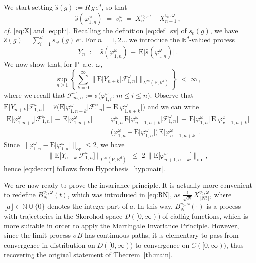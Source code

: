 \documentclass[a4paper,reqno,11pt]{amsart}
\numberwithin{equation}{section}
\newcommand{\bbP}{{\ensuremath{\mathbb P}} }
\newcommand{\cF}{{\ensuremath{\mathcal F}} }
\newcommand{\gs}{\sigma}
\newcommand{\go}{\omega}
\newcommand{\R}{\mathbb{R}}
\newcommand{\N}{\mathbb{N}}
\def\bP{\ensuremath{\bs{\mathrm{P}}}}
\def\bE{\ensuremath{\bs{\mathrm{E}}}}
\def\bs{\boldsymbol}
\renewcommand{\phi}{\varphi}
\begin{document}
We start setting $\hat s(g) := R \, g \, e^d$, so that
\begin{equation} \label{eq:increments}
	\hat s (\phi_{1,n}^\go) \;=\; v_n^\go \;=\; X_n^{v_0, \go} - X_{n-1}^{v_0, \go} \,,
\end{equation}
{\sl cf.} \eqref{eq:X} and \eqref{eq:phi}.
Recalling the definition \eqref{eq:def_sv} of $s_v(g)$, we have
$\hat s(g) = \sum_{i=1}^d s_{e^i}(g) \, e^i$.
For $n=1,2\dots$ we introduce the $\R^d$-valued process
\begin{equation} \label{eq:Y}
	Y_{n} \;:=\; \hat s (\varphi_{1,n}^\omega) \,-\, \bE\big[ \hat s(\varphi_{1,n}^\omega) \big] \,.
\end{equation}
We now show that, for $\bbP$--a.e.~$\go$,
\begin{equation} \label{eq:decorr}
	\sup_{n \ge 1} \left\{ \sum_{k=0}^\infty
	\big\| \bE \big[ Y_{n+k} \big| \cF_{1,n}^\go \big]
	\big\|_{L^\infty(\bP; \R^d)}
	\right\} \; < \; \infty \,,
\end{equation}
where we recall that
$\cF^\go_{m,n} := \gs\big( \phi_{1,i}^\go:\, m \le i \le n \big)$.
Observe that $\bE \big[ Y_{n+k} \big| \cF_{1,n}^\go \big] =
\hat s \big( \bE \big[ \varphi_{1,n+k}^\omega \big|  \cF_{1,n}^\go \big]
- \bE \big[ \varphi_{1,n+k}^\omega \big] \big)$ and we can write
\begin{equation}
\begin{split}
	\bE\big[ \varphi_{1,n+k}^\omega \big|  \cF_{1,n}^\go \big]
	\,-\, \bE \big[ \varphi_{1,n+k}^\omega \big] & \;=\;
	\varphi_{1,n}^\omega\, \bE\big[ \varphi_{n+1,n+k}^\omega \big|  \cF_{1,n}^\go \big]
	\,-\, \bE \big[ \varphi_{1,n}^\omega \big]
	\, \bE \big[ \varphi_{n+1,n+k}^\omega \big] \\
	& \;=\; \big( \varphi_{1,n}^\omega - \bE \big[ \varphi_{1,n}^\omega\big] \big)
	\, \bE\big[ \varphi_{n+1,n+k}^\omega \big] \,.
\end{split}
\end{equation}
Since $\big\| \varphi_{1,n}^\omega - \bE \big[ \varphi_{1,n}^\omega\big] \big\|_{\text{op}} \le 2$,
we have
\begin{equation}
	\big\| \bE \big[ Y_{n+k} \big| \cF_{1,n}^\go \big]
	\big\|_{L^\infty(\bP; \R^d)}
	\;\le\; 2 \, \big\| \bE\big[ \varphi_{n+1,n+k}^\omega \big] \big\|_{\text{op}}\,,
\end{equation}
hence \eqref{eq:decorr} follows from Hypothesis~\ref{hyp:main}.

We are now ready to prove the invariance principle.
It is actually more convenient to
redefine $B^{v_0, \go}_{N}(t)$, which was introduced
in \eqref{eq:BN}, as $\frac{1}{\sqrt N} \, X^{v_0, \omega}_{ \lfloor Nt\rfloor }$, where
$\lfloor a \rfloor \in \N \cup \{0\}$ denotes the integer part of $a$.
In this way, $B^{v_0, \go}_{N}(\cdot)$ is a process with trajectories in the Skorohod space
$D([0, \infty))$ of c\`adl\`ag functions, which is more suitable in order to apply
the Martingale Invariance Principle. However, since the limit process $\gs B$
has continuous paths,
it is elementary to pass from convergence in distribution on $D([0, \infty))$
to convergence on $C([0, \infty))$, thus recovering the original statement of Theorem~\ref{th:main}.
\end{document}
